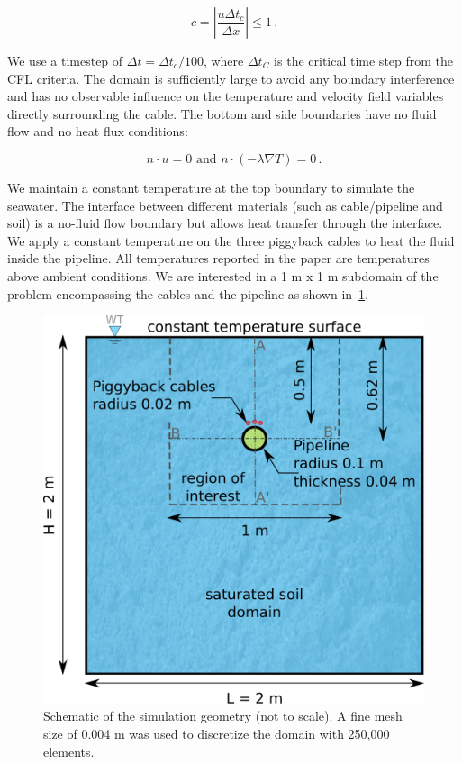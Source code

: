 \documentclass[Journal,letterpaper,InsideFigs]{ascelike-new}
\begin{document}
\begin{equation}
c = |\frac{u \Delta t_c}{\Delta x}| \le 1\,.
\end{equation}

We use a timestep of $\Delta t = \Delta t_c / 100$, where $\Delta t_C$ is the critical time step from the CFL criteria. The domain is sufficiently large to avoid any boundary interference and has no observable influence on the temperature and velocity field variables directly surrounding the cable. The bottom and side boundaries have no fluid flow and no heat flux conditions:

\begin{equation}
n \cdot u = 0 \text{ and } n \cdot (-\lambda \nabla T) = 0\,.
\end{equation}

We maintain a constant temperature at the top boundary to simulate the seawater. The interface between different materials (such as cable/pipeline and soil) is a no-fluid flow boundary but allows heat transfer through the interface. We apply a constant temperature on the three piggyback cables to heat the fluid inside the pipeline. All temperatures reported in the paper are temperatures above ambient conditions. We are interested in a 1 m x 1 m subdomain of the problem encompassing the cables and the pipeline as shown in~\cref{fig:model}.

\begin{figure}[!h]
    \centering
    \includegraphics[width=\linewidth]{figs/model.pdf}
    \caption{Schematic of the simulation geometry (not to scale). A fine mesh size of 0.004 m was used to discretize the domain with 250,000 elements.}
    \label{fig:model}
\end{figure}
\end{document}
